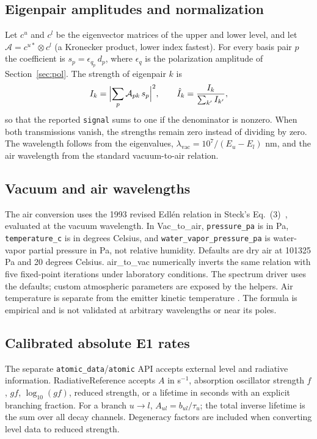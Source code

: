 \documentclass[11pt,a4paper]{article}
\newcommand{\code}[1]{\texttt{#1}}
\newcommand{\routine}[1]{\textsf{#1}}
\newcommand{\opt}[1]{\texttt{\detokenize{#1}}}
\numberwithin{equation}{section}
\begin{document}
\subsection{Eigenpair amplitudes and normalization}
Let $c^{u}$ and $c^{l}$ be the eigenvector matrices of the upper and lower level, and let $\mathcal A=c^{u*}\otimes c^{l}$ (a Kronecker product, lower index fastest). For every basis pair $p$ the coefficient is $s_p=\epsilon_{q_p}\,d_p$, where $\epsilon_q$ is the polarization amplitude of Section~\ref{sec:pol}. The strength of eigenpair $k$ is
\begin{equation}
I_k=\Bigl\vert\sum_p \mathcal A_{pk}\,s_p\Bigr\vert^{2},\qquad \hat I_k=\frac{I_k}{\sum_{k'} I_{k'}},
\end{equation}
so that the reported \code{signal} sums to one if the denominator is nonzero. When both transmissions vanish, the strengths remain zero instead of dividing by zero. The wavelength follows from the eigenvalues, $\lambda_{\mathrm{vac}}=10^{7}/(E_u-E_l)$ nm, and the air wavelength from the standard vacuum-to-air relation.

\subsection{Vacuum and air wavelengths}
The air conversion uses the 1993 revised Edl\'en relation in Steck's Eq.~(3)~\cite{steck87}, evaluated at the vacuum wavelength. In \routine{Vac\_to\_air}, \code{pressure\_pa} is in Pa, \code{temperature\_c} is in degrees Celsius, and \code{water\_vapor\_pressure\_pa} is water-vapor partial pressure in Pa, not relative humidity. Defaults are dry air at 101325 Pa and 20 degrees Celsius. \routine{air\_to\_vac} numerically inverts the same relation with five fixed-point iterations under laboratory conditions. The spectrum driver uses the defaults; custom atmospheric parameters are exposed by the helpers. Air temperature is separate from the emitter kinetic temperature \opt{Temp}. The formula is empirical and is not validated at arbitrary wavelengths or near its poles.

\subsection{Calibrated absolute E1 rates}\label{sec:absolute}
The separate \code{atomic\_data}/\code{atomic} API accepts external level and radiative information. \routine{RadiativeReference} accepts $A$ in s$^{-1}$, absorption oscillator strength $f$, $gf$, $\log_{10}(gf)$, reduced strength, or a lifetime in seconds with an explicit branching fraction. For a branch $u\to l$, $A_{ul}=b_{ul}/\tau_u$; the total inverse lifetime is the sum over all decay channels. Degeneracy factors are included when converting level data to reduced strength.
\end{document}
